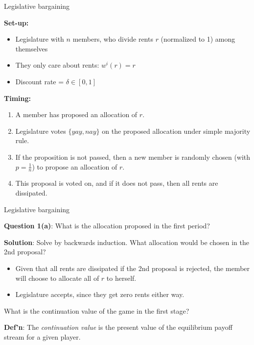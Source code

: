 \documentclass[11pt,aspectratio=169]{beamer}
\begin{document}
\begin{frame}{Legislative bargaining}

\textbf{Set-up:}

\begin{itemize}
\item Legislature with $n$ members, who divide rents $r$ (normalized to 1) among themselves
\item They only care about rents: $w^i(r) = r$
\item Discount rate = $\delta \in [0,1]$
\end{itemize}

\pause 

\textbf{Timing:}

\begin{enumerate}
\item A member has proposed an allocation of $r$.
\item Legislature votes $\{yay, nay\}$ on the proposed allocation under simple majority rule.
\item If the proposition is not passed, then a new member is randomly chosen (with $p = \frac{1}{n}$) to propose an allocation of $r$.
\item This proposal is voted on, and if it does not pass, then all rents are dissipated.
\end{enumerate}

\end{frame}
\begin{frame}{Legislative bargaining}

\textbf{Question 1(a)}: What is the allocation proposed in the first period?

\textbf{Solution}: Solve by backwards induction. What allocation would be chosen in the 2nd proposal? 
\pause 
\begin{itemize}
\item Given that all rents are dissipated if the 2nd proposal is rejected, the member will choose to allocate all of $r$ to herself. 
\item Legislature accepts, since they get zero rents either way. 
\end{itemize} 
\pause

What is the continuation value of the game in the first stage?

\begin{tcolorbox}
\textbf{Def'n}: The \textit{continuation value} is the present value of the equilibrium payoff stream for a given player.
\end{tcolorbox}

\end{frame}
\end{document}
